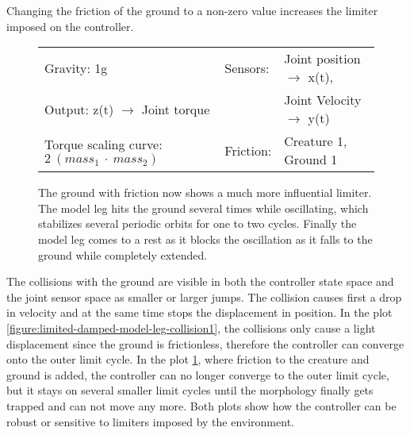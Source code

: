 \documentclass[main]{subfiles}
\begin{document}
Changing the friction of the ground to a non-zero value increases the limiter imposed on the controller.

\begin{figure}[H]
	\centering
	\begin{minipage}{1.3\textwidth}
	\hspace*{-5em}
	\end{minipage}
	\caption[Limited chaotic controller controlling model leg on ground with friction]{The ground with friction now shows a much more influential limiter. The model leg hits the ground several times while oscillating, which stabilizes several periodic orbits for one to two cycles. Finally the model leg comes to a rest as it blocks the oscillation as it falls to the ground while completely extended.}
	\begin{tabular}{l|ll}
	\hline 
	Gravity: 1g  & Sensors: & Joint position \(\rightarrow\) x(t),\\
	 Output: z(t) \(\rightarrow\) Joint torque &  & Joint Velocity \(\rightarrow\) y(t) \\
	  Torque scaling curve: \(2~(mass_1~\cdot~mass_2)\) & Friction: & Creature 1, Ground 1 \\
	  \hline
	\end{tabular}

	\label{figure:limited-damped-model-leg-collision2}
\end{figure}

The collisions with the ground are visible in both the controller state space and the joint sensor space as smaller or larger jumps. %
%
The collision causes first a drop in velocity and at the same time stops the displacement in position. %
%
In the plot \ref{figure:limited-damped-model-leg-collision1}, the collisions only cause a light displacement since the ground is frictionless, therefore the controller can converge onto the outer limit cycle. %
%
In the plot \ref{figure:limited-damped-model-leg-collision2}, where  friction to the creature and ground is added, the controller can no longer converge to the outer limit cycle, but it stays on several smaller limit cycles until the morphology finally gets trapped and can not move any more. %
%
Both plots show how the controller can be robust or sensitive to limiters imposed by the environment.
\end{document}
